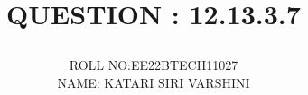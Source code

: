 \documentclass[journal,12pt,twocolumn]{IEEEtran}
\theoremstyle{remark}
\begin{document}
\let\vec\mathbf




\vspace{3cm}

\title{

\textbf{QUESTION : 12.13.3.7} 

}
\author{ ROLL NO:EE22BTECH11027\\
         NAME: KATARI SIRI VARSHINI
	}
	
	

\maketitle

\newpage


\bigskip
\end{document}
